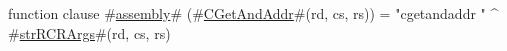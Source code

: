 function clause #\hyperref[sailMIPSzassembly]{assembly}# (#\hyperref[sailMIPSzCGetAndAddr]{CGetAndAddr}#(rd, cs, rs)) = "cgetandaddr " ^ #\hyperref[sailMIPSzstrRCRArgs]{strRCRArgs}#(rd, cs, rs)
